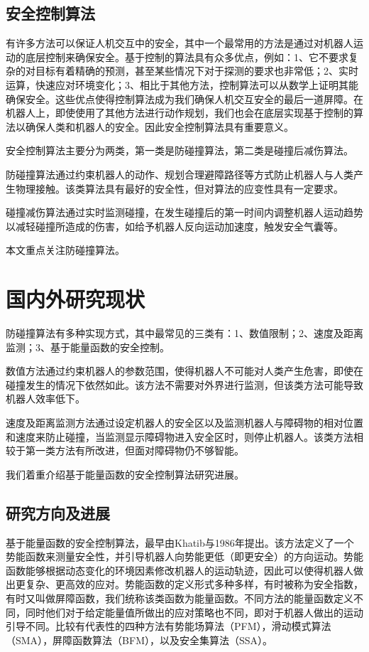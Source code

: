 \subsection{安全控制算法}

有许多方法可以保证人机交互中的安全，其中一个最常用的方法是通过对机器人运动的底层控制来确保安全。基于控制的算法具有众多优点，例如：1、它不要求复杂的对目标有着精确的预测，甚至某些情况下对于探测的要求也非常低；2、实时运算，快速应对环境变化；3、相比于其他方法，控制算法可以从数学上证明其能确保安全。这些优点使得控制算法成为我们确保人机交互安全的最后一道屏障。在机器人上，即使使用了其他方法进行动作规划，我们也会在底层实现基于控制的算法以确保人类和机器人的安全。因此安全控制算法具有重要意义。

安全控制算法主要分为两类，第一类是防碰撞算法，第二类是碰撞后减伤算法。

防碰撞算法通过约束机器人的动作、规划合理避障路径等方式防止机器人与人类产生物理接触。该类算法具有最好的安全性，但对算法的应变性具有一定要求。

碰撞减伤算法通过实时监测碰撞，在发生碰撞后的第一时间内调整机器人运动趋势以减轻碰撞所造成的伤害，如给予机器人反向运动加速度，触发安全气囊等。

本文重点关注防碰撞算法。

\section{国内外研究现状}
防碰撞算法有多种实现方式，其中最常见的三类有：1、数值限制；2、速度及距离监测；3、基于能量函数的安全控制。

数值方法通过约束机器人的参数范围，使得机器人不可能对人类产生危害，即使在碰撞发生的情况下依然如此\cite{broquere2008soft}。该方法不需要对外界进行监测，但该类方法可能导致机器人效率低下。

速度及距离监测方法通过设定机器人的安全区以及监测机器人与障碍物的相对位置和速度来防止碰撞，当监测显示障碍物进入安全区时，则停止机器人\cite{lasota2014toward}。该类方法相较于第一类方法有所改进，但面对障碍物仍不够智能。

我们着重介绍基于能量函数的安全控制算法研究进展。

\subsection{研究方向及进展}

基于能量函数的安全控制算法，最早由Khatib与1986年提出\cite{khatib1986real}。该方法定义了一个势能函数来测量安全性，并引导机器人向势能更低（即更安全）的方向运动。势能函数能够根据动态变化的环境因素修改机器人的运动轨迹，因此可以使得机器人做出更复杂、更高效的应对。势能函数的定义形式多种多样，有时被称为安全指数，有时又叫做屏障函数，我们统称该类函数为能量函数。不同方法的能量函数定义不同，同时他们对于给定能量值所做出的应对策略也不同，即对于机器人做出的运动引导不同。比较有代表性的四种方法有势能场算法（PFM）\cite{khatib1986real}，滑动模式算法（SMA）\cite{gracia2013reactive}，屏障函数算法（BFM）\cite{ames2014control}，以及安全集算法（SSA）\cite{liu2014control}。

